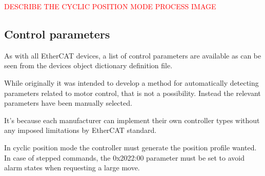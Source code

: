 \textcolor{red}{DESCRIBE THE CYCLIC POSITION MODE PROCESS IMAGE}

\subsection{Control parameters}

As with all EtherCAT devices, a list of control parameters are available as can be seen from the devices object dictionary definition file.

While originally it was intended to develop a method for automatically detecting parameters related to motor control, that is not a possibility. 
Instead the relevant parameters have been manually selected. 

It's because each manufacturer can implement their own controller types without any imposed limitations by EtherCAT standard. 

In cyclic position mode the controller must generate the position profile wanted.
In case of stepped commands, the 0x2022:00 parameter must be set to avoid alarm states when requesting a large move. 

